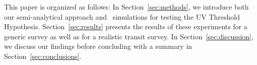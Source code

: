 \documentclass[twocolumn,twocolappendix,linenumbers]{aastex631}
\begin{document}
%

This paper is organized as follows:
In Section~\ref{sec:methods}, we introduce both our semi-analytical approach and \bioverse\ simulations for testing the UV Threshold Hypothesis.
Section~\ref{sec:results} presents the results of these experiments for a generic survey as well as for a realistic transit survey.
In Section~\ref{sec:discussion}, we discuss our findings before concluding with a summary in Section~\ref{sec:conclusions}.

%
\end{document}
